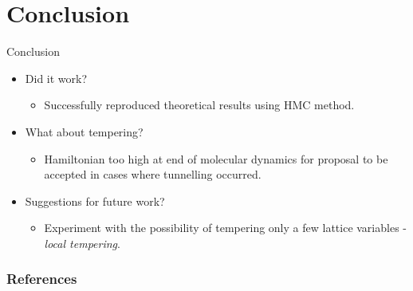 \documentclass{beamer}
\begin{document}
\section{Conclusion}
    \begin{frame}{Conclusion}
        \begin{itemize}
            \item<1-> Did it work? 
            \begin{itemize}
                \item<1-> Successfully reproduced theoretical results using HMC method.
            \end{itemize}
            \item<2-> What about tempering?
            \begin{itemize}
                \item<2-> Hamiltonian too high at end of molecular dynamics for proposal to be accepted in cases where tunnelling occurred.
            \end{itemize}
            \item<3-> Suggestions for future work?
            \begin{itemize}
                \item<3-> Experiment with the possibility of tempering only a few lattice variables - \textit{local tempering}.
            \end{itemize}
        \end{itemize}
    \end{frame}


\begin{frame}[t, allowframebreaks]
    \frametitle{References}
    
    
\end{frame}
\end{document}
